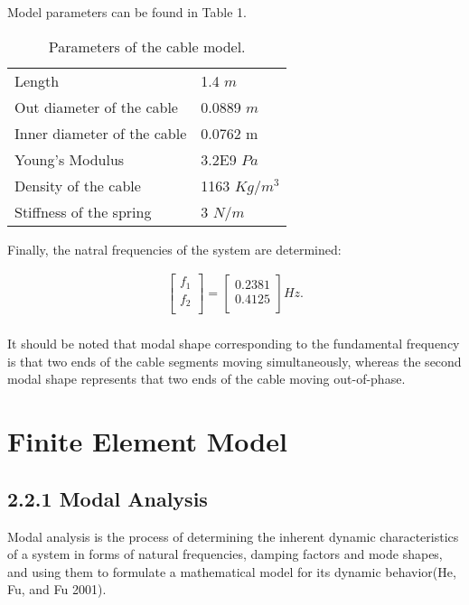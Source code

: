\documentclass[paper=a4, fontsize=11pt]{scrartcl} %
\numberwithin{equation}{section} %
\numberwithin{figure}{section} %
\numberwithin{table}{section} %
\begin{document}
Model parameters can be found in Table 1.

\begin{table}
  \centering
  \begin{tabular}{ll}
    Length	&   1.4 $m$ \\
    Out diameter of the cable &	0.0889 $m$ \\
    Inner diameter of the cable &	0.0762 m \\
    Young's Modulus	& 3.2E9 $Pa$\\
    Density of the cable & 	 1163 $Kg/m^{3}$\\
    Stiffness of the spring	 &  3 $N/m$ \\
  \end{tabular}
  \caption{Parameters of the cable model.}
  \label{tab:cable-parameter}
\end{table}

Finally, the natral frequencies of the system are determined:

\begin{align}
\left[\begin{matrix}f_1\\f_2\\\end{matrix}\right]=\left[\begin{matrix}0.2381\\0.4125\\\end{matrix}\right]
  Hz.\\
\end{align}

It should be noted that modal shape corresponding to the fundamental
frequency is that two ends of the cable segments moving
simultaneously, whereas the second modal shape represents that two
ends of the cable moving out-of-phase.

\section{Finite Element Model}
\label{sec:finite-element-model}

\subsection{2.2.1	Modal Analysis}
\label{sec:2.2.1-modal-analysis}

Modal analysis is the process of determining the inherent dynamic
characteristics of a system in forms of natural frequencies, damping
factors and mode shapes, and using them to formulate a mathematical
model for its dynamic behavior(He, Fu, and Fu 2001).
\end{document}
